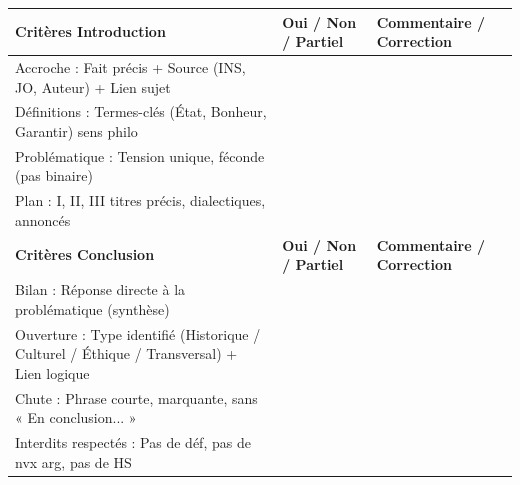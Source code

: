 \documentclass[11pt]{article}
\begin{document}
\begin{center}
\begin{tabularx}{\linewidth}{|l|X|X|}\hline
\textbf{Critères Introduction} & \textbf{Oui / Non / Partiel} & \textbf{Commentaire / Correction} \\ \hline
Accroche : Fait précis + Source (INS, JO, Auteur) + Lien sujet & & \\ \hline
Définitions : Termes-clés (État, Bonheur, Garantir) sens philo & & \\ \hline
Problématique : Tension unique, féconde (pas binaire) & & \\ \hline
Plan : I, II, III titres précis, dialectiques, annoncés & & \\ \hline \hline
\textbf{Critères Conclusion} & \textbf{Oui / Non / Partiel} & \textbf{Commentaire / Correction} \\ \hline
Bilan : Réponse directe à la problématique (synthèse) & & \\ \hline
Ouverture : Type identifié (Historique / Culturel / Éthique / Transversal) + Lien logique & & \\ \hline
Chute : Phrase courte, marquante, sans « En conclusion... » & & \\ \hline
Interdits respectés : Pas de déf, pas de nvx arg, pas de HS & & \\ \hline
\end{tabularx}
\end{center}
\end{document}
